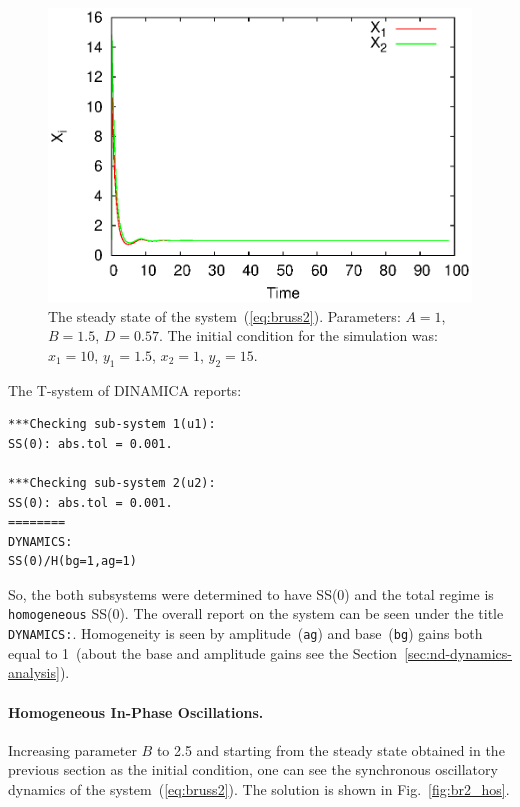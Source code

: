 \documentclass[11pt,a4paper]{article}
\begin{document}
\begin{figure}[h]
  \centering
  \includegraphics[scale=0.65]{br2_hss}
  \caption{The steady state of the system~(\ref{eq:bruss2}). Parameters: $A=1$,
    $B=1.5$, $D=0.57$. The initial condition for the simulation was: $x_1=10$,
    $y_1=1.5$, $x_2=1$, $y_2=15$.}
  \label{fig:br2_hss}
\end{figure}

The T-system of DINAMICA reports:
\begin{verbatim}
***Checking sub-system 1(u1):
SS(0): abs.tol = 0.001.

***Checking sub-system 2(u2):
SS(0): abs.tol = 0.001.
========
DYNAMICS:
SS(0)/H(bg=1,ag=1)
\end{verbatim}

So, the both subsystems were determined to have SS(0) and the total regime is
\texttt{homogeneous} SS(0). The overall report on the system can be seen under the
title \texttt{DYNAMICS:}. Homogeneity is seen by amplitude~(\texttt{ag}) and
base~(\texttt{bg}) gains both equal to 1~(about the base and amplitude gains see the
Section~\ref{sec:nd-dynamics-analysis}).

\paragraph{Homogeneous In-Phase Oscillations.}
\label{sec:homog-phase-oscill}

Increasing parameter $B$ to 2.5 and starting from the steady state obtained in the
previous section as the initial condition, one can see the synchronous oscillatory
dynamics of the system~(\ref{eq:bruss2}). The solution is shown in
Fig.~\ref{fig:br2_hos}.
\end{document}
